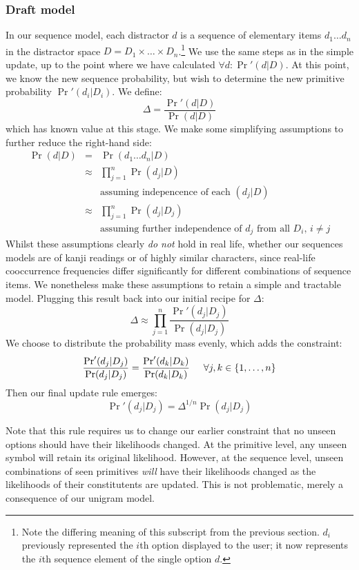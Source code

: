 \documentclass[11pt,a4paper]{article}
\begin{document}
\subsubsection{Draft model}
In our sequence model, each distractor $d$ is a sequence of elementary items
$d_1 \dots d_n$ in the distractor space $D = D_1 \times \dots \times
D_n$.\footnote{Note the differing meaning of this subscript from the previous
section. $d_i$ previously represented the $i$th option displayed to the user;
it now represents the $i$th sequence element of the single option $d$.}
We use the same steps as in the simple update, up to the point where we have
calculated $\forall d : \Pr'(d|D)$. At this point, we know the new sequence
probability, but wish to determine the new primitive probability
$\Pr'(d_i|D_i)$. We define:
\[
\Delta = \frac{{\Pr}'(d|D)}{\Pr(d|D)}
\]
which has known value at this stage. We make some simplifying assumptions to
further reduce the right-hand side:
\begin{eqnarray*}
\Pr(d|D) & = & \Pr(d_{1} \dots d_{n}|D)\\
& \approx & \prod_{j=1}^n \Pr(d_j|D)\\
& & \text{assuming indepencence of each $(d_{j}|D)$}\\
& \approx & \prod_{j=1}^n \Pr(d_j|D_j)\\
& & \text{assuming further independence of $d_j$ from all $D_i$, $i \ne j$}
\end{eqnarray*}
Whilst these assumptions clearly {\it do not} hold in real life, whether our
sequences models are of kanji readings or of highly similar characters, since 
real-life cooccurrence frequencies differ significantly for different
combinations of sequence items. We nonetheless make these assumptions to retain a simple and tractable model. Plugging this result back into our initial recipe for $\Delta$:
\[
\Delta \approx \prod_{j=1}^n \frac{{\Pr}'(d_j|D_j)}{\Pr(d_j|D_j)}
\]
We choose to distribute the probability mass evenly, which adds the
constraint:
\[
\frac{{\Pr}'(d_j|D_j)}{\Pr(d_j|D_j)} = \frac{{\Pr}'(d_k|D_k)}{\Pr(d_k|D_k)}
\mbox{\hspace{0.5cm}}
\forall j, k \in \{{1, \dots, n}\} 
\]
Then our final update rule emerges:
\[
{\Pr}'(d_j|D_j) = \Delta^{1/n} \Pr(d_j|D_j)
\]

Note that this rule requires us to change our earlier constraint that no unseen
options should have their likelihoods changed. At the primitive level, any
unseen symbol will retain its original likelihood. However, at the sequence
level, unseen combinations of seen primitives {\it will} have their
likelihoods changed as the likelihoods of their constitutents are updated.
This is not problematic, merely a consequence of our unigram model.
\end{document}
